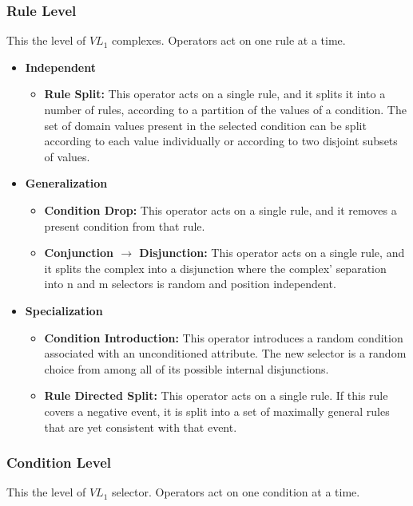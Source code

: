 \documentclass[../main.tex]{subfiles}
\begin{document}
\subsubsection{Rule Level} This the level of $VL_1$ complexes. Operators act on one rule at a time.

\begin{itemize}
	\item \textbf{Independent}
	\begin{itemize}
		\item \textbf{Rule Split:} This operator acts on a single rule, and it splits it into a number of rules,
		according to a partition of the values of a condition. The set of domain values present in the selected
		condition can be split according to each value individually or according to two disjoint subsets of values.
	\end{itemize}
	\item \textbf{Generalization}
	\begin{itemize}
		\item \textbf{Condition Drop:} This operator acts on a single rule, and it removes a present condition from
		that rule.
		\item \textbf{Conjunction $\rightarrow$ Disjunction:} This operator acts on a single rule, and it splits the
		complex into a disjunction where the complex' separation into n and m selectors is random and position
		independent.
	\end{itemize}
	\item \textbf{Specialization}
	\begin{itemize}
		\item \textbf{Condition Introduction:} This operator introduces a random condition associated with an
		unconditioned attribute. The new selector is a random choice from among all of its possible internal
		disjunctions.
		\item \textbf{Rule Directed Split:}  This operator acts on a single rule. If this rule covers a negative event,
		it is split into a set of maximally general rules that are yet consistent with that event.
	\end{itemize}
\end{itemize}

\subsubsection{Condition Level} This the level of $VL_1$ selector. Operators act on one condition at a time.
\end{document}
